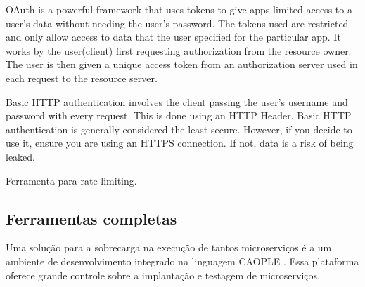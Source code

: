 OAuth is a powerful framework that uses tokens to give apps limited access to a user’s data without needing the user’s password. The tokens used are restricted and only allow access to data that the user specified for the particular app. It works by the user(client) first requesting authorization from the resource owner. The user is then given a unique access token from an authorization server used in each request to the resource server.

Basic HTTP authentication involves the client passing the user’s username and password with every request. This is done using an HTTP Header. Basic HTTP authentication is generally considered the least secure. However, if you decide to use it, ensure you are using an HTTPS connection. If not, data is a risk of being leaked.

Ferramenta para rate limiting. \cite{rapidAPI-twitter}

\subsection{Ferramentas completas}

Uma solução para a sobrecarga na execução de tantos microserviços é a um ambiente de desenvolvimento integrado na linguagem CAOPLE \cite{CAOPLE}. Essa plataforma oferece grande controle sobre a implantação e testagem de microserviços.
